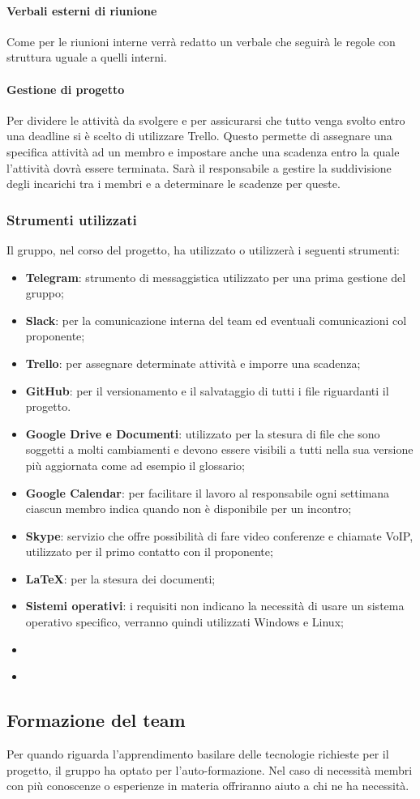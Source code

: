 			\paragraph{Verbali esterni di riunione}
			Come per le riunioni interne verrà redatto un verbale che seguirà le regole con struttura uguale a quelli interni.
			\paragraph{Gestione di progetto}
			Per dividere le attività da svolgere e per assicurarsi che tutto venga svolto entro una deadline si è scelto di utilizzare Trello. Questo permette di assegnare una specifica attività ad un membro e impostare anche una scadenza entro la quale l'attività dovrà essere terminata. Sarà il responsabile a gestire la suddivisione degli incarichi tra i membri e a determinare le scadenze per queste.
		\subsubsection{Strumenti utilizzati}
		Il gruppo, nel corso del progetto, ha utilizzato o utilizzerà i seguenti strumenti:
		\begin{itemize}
			\item \textbf{Telegram}: strumento di messaggistica utilizzato per una prima gestione del gruppo;
			\item \textbf{Slack}: per la comunicazione interna del team ed eventuali comunicazioni col proponente;
			\item \textbf{Trello}: per assegnare determinate attività e imporre una scadenza;
			\item \textbf{GitHub}: per il versionamento e il salvataggio di tutti i file riguardanti il progetto.
			\item \textbf{Google Drive e Documenti}: utilizzato per la stesura di file che sono soggetti a molti cambiamenti e devono essere visibili a tutti nella sua versione più aggiornata come ad esempio il glossario;
			\item \textbf{Google Calendar}: per facilitare il lavoro al responsabile ogni settimana ciascun membro indica quando non è disponibile per un incontro;
			\item \textbf{Skype}: servizio che offre possibilità di fare video conferenze e chiamate VoIP, utilizzato per il primo contatto con il proponente;
			\item \textbf{\LaTeX}: per la stesura dei documenti;
			\item \textbf{Sistemi operativi}: i requisiti non indicano la necessità di usare un sistema operativo specifico, verranno quindi utilizzati Windows e Linux; %
			\item \textbf{} %
			\item \textbf{} %
		\end{itemize}
	\subsection{Formazione del team}
	Per quando riguarda l'apprendimento basilare delle tecnologie richieste per il progetto, il gruppo ha optato per l'auto-formazione. Nel caso di necessità membri con più conoscenze o esperienze in materia offriranno aiuto a chi ne ha necessità.			